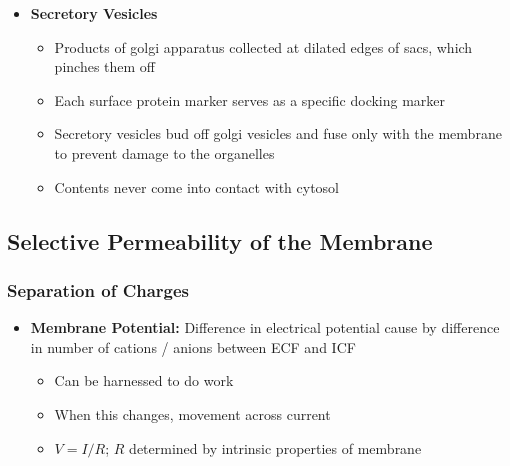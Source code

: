 \documentclass[11pt]{article}
\begin{document}
\begin{itemize}
\begin{itemize}
\end{itemize}

\item \textbf{Secretory Vesicles}
\begin{itemize}
\item Products of golgi apparatus collected at dilated edges of sacs, which pinches them off
\item Each surface protein marker serves as a specific docking marker
\item Secretory vesicles bud off golgi vesicles and fuse only with the membrane to prevent damage to the organelles
\item Contents never come into contact with cytosol
\end{itemize}

\end{itemize}

\subsection{Selective Permeability of the Membrane}

\subsubsection{Separation of Charges }
\begin{itemize}
\item \textbf{Membrane Potential:} Difference in electrical potential cause by difference in number of cations / anions between ECF and ICF 
\begin{itemize}
\item Can be harnessed to do work
\item When this changes, movement across current
\item $V = I/R$; $R$ determined by intrinsic properties of membrane
\end{itemize}
\end{itemize}
\end{document}

